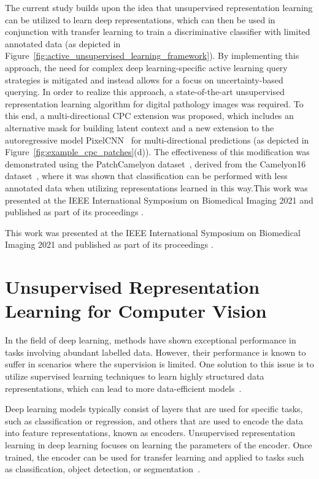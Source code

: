 The current study builds upon the idea that unsupervised representation learning can be utilized to learn deep representations, which can then be used in conjunction with transfer learning to train a discriminative classifier with limited annotated data (as depicted in Figure~\ref{fig:active_unsupervised_learning_framework}). By implementing this approach, the need for complex deep learning-specific active learning query strategies is mitigated and instead allows for a focus on uncertainty-based querying. In order to realize this approach, a state-of-the-art unsupervised representation learning algorithm for digital pathology images was required. To this end, a multi-directional CPC extension was proposed, which includes an alternative mask for building latent context and a new extension to the autoregressive model PixelCNN~\citep{oord2016pixel} for multi-directional predictions (as depicted in Figure~\ref{fig:example_cpc_patches}(d)). The effectiveness of this modification was demonstrated using the PatchCamelyon dataset~\citep{veeling2018rotation}, derived from the Camelyon16 dataset~\citep{litjens20181399}, where it was shown that classification can be performed with less annotated data when utilizing representations learned in this way.This work was presented at the IEEE International Symposium on Biomedical Imaging 2021 and published as part of its proceedings \citep{carse2021unsupervised}.

This work was presented at the IEEE International Symposium on Biomedical Imaging 2021 and published as part of its proceedings \citep{carse2021unsupervised}.



\section{Unsupervised Representation Learning for Computer Vision}
\label{subsec:unsupervised_representation}
In the field of deep learning, methods have shown exceptional performance in tasks involving abundant labelled data. However, their performance is known to suffer in scenarios where the supervision is limited. One solution to this issue is to utilize supervised learning techniques to learn highly structured data representations, which can lead to more data-efficient models~\citep{lake2015human}.

Deep learning models typically consist of layers that are used for specific tasks, such as classification or regression, and others that are used to encode the data into feature representations, known as encoders. Unsupervised representation learning in deep learning focuses on learning the parameters of the encoder. Once trained, the encoder can be used for transfer learning and applied to tasks such as classification, object detection, or segmentation~\citep{weiss2016survey}.

